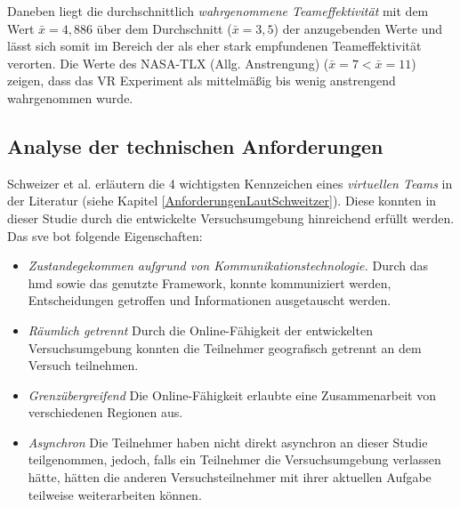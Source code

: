\documentclass[a4paper,11pt]{article}%
\renewcommand{\\}{\vspace*{0.5\baselineskip} \newline}
\begin{document}
{{Daneben liegt die durchschnittlich \textit{wahrgenommene Teameffektivität} mit dem Wert $\bar{x} = 4,886$ über dem Durchschnitt ($\bar{x} = 3,5$) der anzugebenden Werte und lässt sich somit im Bereich der als eher stark empfundenen Teameffektivität verorten.
Die Werte des NASA-TLX (Allg. Anstrengung) ($\bar{x} = 7 < \bar{x} = 11$) zeigen, dass das VR Experiment als mittelmäßig bis wenig anstrengend wahrgenommen wurde.

\subsection{Analyse der technischen Anforderungen}
Schweizer et al. \citep[S. 270]{schweitzer2010conceptualizing} erläutern die 4 wichtigsten Kennzeichen eines \textit{virtuellen Teams} in der Literatur (siehe Kapitel \ref{AnforderungenLautSchweitzer}). Diese konnten in dieser Studie durch die entwickelte Versuchsumgebung hinreichend erfüllt werden. Das \ac{sve} bot folgende Eigenschaften:
\begin{itemize}
\item \textit{Zustandegekommen aufgrund von Kommunikationstechnologie.} Durch das \ac{hmd} sowie das genutzte Framework, konnte kommuniziert werden, Entscheidungen getroffen und Informationen ausgetauscht werden.
\item \textit{Räumlich getrennt} Durch die Online-Fähigkeit der entwickelten Versuchsumgebung konnten die Teilnehmer geografisch getrennt an dem Versuch teilnehmen.
\item \textit{Grenzübergreifend} Die Online-Fähigkeit erlaubte eine Zusammenarbeit von verschiedenen Regionen aus.
\item \textit{Asynchron} Die Teilnehmer haben nicht direkt asynchron an dieser Studie teilgenommen, jedoch, falls ein Teilnehmer die Versuchsumgebung verlassen hätte, hätten die anderen Versuchsteilnehmer mit ihrer aktuellen Aufgabe teilweise weiterarbeiten können.
\end{itemize}

}}
\end{document}
